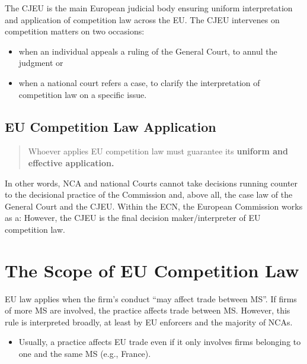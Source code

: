     The CJEU is the main European judicial body ensuring uniform interpretation and application of competition law across the EU. The CJEU intervenes on competition matters on two occasions:
        \begin{itemize}
            \item when an individual appeals a ruling of the General Court, to annul the judgment or
            \item when a national court refers a case, to clarify the interpretation of competition law on a specific issue.
        \end{itemize}

    \subsection{EU Competition Law Application}

        \begin{quote}
            Whoever applies EU competition law must guarantee its \textbf{uniform and effective application.}
        \end{quote}

        In other words, NCA and national Courts cannot take decisions running counter to the decisional practice of the Commission and, above all, the case law of the General Court and the CJEU. Within the ECN, the European Commission works as a: However, the CJEU is the final decision maker/interpreter of EU competition law.

        
\newpage
\section{The Scope of EU Competition Law}

    EU law applies when the firm’s conduct “may affect trade between MS”.  
    If firms of more MS are involved, the practice affects trade between MS.  
    However, this rule is interpreted broadly, at least by EU enforcers and the majority of NCAs.
    \begin{itemize}
        \item Usually, a practice affects EU trade even if it only involves firms belonging to one and the same MS (e.g., France).
    \end{itemize}
    
